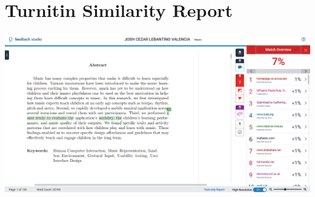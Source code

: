 \chapter{Turnitin Similarity Report}
\label{sec:appendixb}


\includegraphics[width=17cm]{figures/Results/turnitin.png}